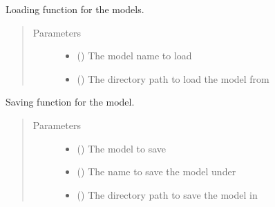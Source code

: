 \documentclass[letterpaper,10pt,english]{sphinxmanual}
\begin{document}

\begin{fulllineitems}
\label{\detokenize{index:Forecaster.deeplearning.model_load}}
Loading function for the models.
\begin{quote}\begin{description}
\item[{Parameters}] \leavevmode\begin{itemize}
\item {} 
 () \textendash{} The model name to load

\item {} 
 () \textendash{} The directory path to load the model from

\end{itemize}

\end{description}\end{quote}

\end{fulllineitems}


\begin{fulllineitems}
\label{\detokenize{index:Forecaster.deeplearning.model_save}}
Saving function for the model.
\begin{quote}\begin{description}
\item[{Parameters}] \leavevmode\begin{itemize}
\item {} 
 () \textendash{} The model to save

\item {} 
 () \textendash{} The name to save the model under

\item {} 
 () \textendash{} The directory path to save the model in

\end{itemize}

\end{description}\end{quote}

\end{fulllineitems}
\end{document}
